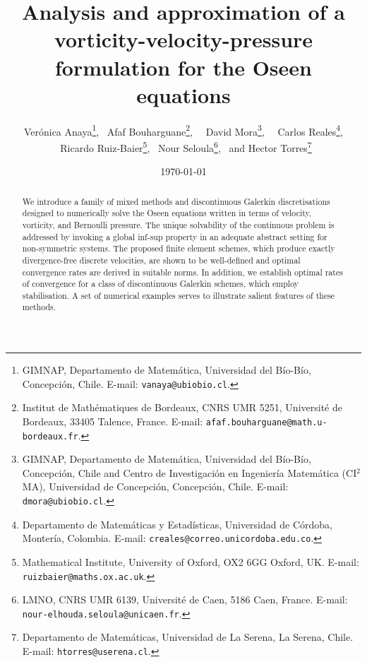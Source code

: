 \documentclass[reqno,a4paper]{article}
\numberwithin{equation}{section}
\begin{document}
\title{Analysis and approximation of a vorticity-velocity-pressure 
formulation for the Oseen equations}

\author{{\sc Ver\'onica Anaya}\thanks{GIMNAP, Departamento de Matem\'atica,
Universidad del B\'io-B\'io, Concepci\'on, Chile. E-mail:  
{\tt vanaya@ubiobio.cl}.},  \ 
{\sc Afaf Bouharguane}\thanks{Institut de Math\'ematiques de Bordeaux, 
CNRS UMR 5251, Universit\'e de Bordeaux, 33405 Talence, France. E-mail: {\tt afaf.bouharguane@math.u-bordeaux.fr}.}, \ 
\ {\sc David Mora}\thanks{GIMNAP, Departamento de Matem\'atica, Universidad
del B\'io-B\'io, Concepci\'on, Chile and
Centro de Investigaci\'on en Ingenier\'ia Matem\'atica
(CI$^2$MA), Universidad de Concepci\'on, Concepci\'on, Chile.
E-mail: {\tt dmora@ubiobio.cl}.}, \ 
\ {\sc Carlos Reales}\thanks{Departamento de Matem\'aticas
y Estad\'isticas, Universidad de C\'ordoba, Monter\'ia, Colombia. E-mail: 
{\tt creales@correo.unicordoba.edu.co}.}, \\
\ {\sc Ricardo Ruiz-Baier}\thanks{Mathematical Institute,
University of Oxford,  OX2 6GG Oxford, UK. E-mail: {\tt ruizbaier@maths.ox.ac.uk}.},  \ 
{\sc Nour Seloula}\thanks{LMNO, CNRS UMR 6139,
Universit\'e de Caen, 5186 Caen, France. E-mail: {\tt nour-elhouda.seloula@unicaen.fr}.}, 
\ and {\sc Hector Torres}\thanks{Departamento de Matem\'aticas, Universidad de La Serena, 
La Serena, Chile. E-mail: {\tt htorres@userena.cl}.}
}

\date{\today}
\maketitle

\begin{abstract}
\noindent 
We introduce a family of mixed methods and discontinuous Galerkin discretisations designed to numerically solve the Oseen equations written in terms of velocity, vorticity, and Bernoulli pressure. The unique solvability of the continuous problem is addressed by invoking a global inf-sup property in an adequate abstract setting for non-symmetric systems. The proposed finite element schemes, which produce exactly divergence-free discrete velocities, are shown to be well-defined and optimal convergence rates are derived in suitable norms. In addition, we establish optimal rates of convergence for a class of discontinuous Galerkin schemes, which employ stabilisation. A set of numerical examples serves to illustrate salient features of these methods. 
\end{abstract}
\end{document}
